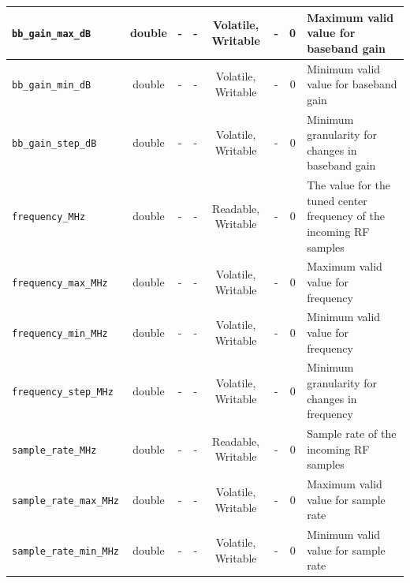 \documentclass{article}
\begin{document}
\begin{landscape}
\begin{scriptsize}
\begin{tabular}{|p{4cm}|c|c|c|c|c|c|p{8cm}|}
			\hline
			\verb+bb_gain_max_dB+               & double & -        & -          & Volatile, Writable & -           & 0       & Maximum valid value for baseband gain                                                      \\
			\hline
			\verb+bb_gain_min_dB+               & double & -        & -          & Volatile, Writable & -           & 0       & Minimum valid value for baseband gain                                                      \\
			\hline
			\verb+bb_gain_step_dB+              & double & -        & -          & Volatile, Writable & -           & 0       & Minimum granularity for changes in baseband gain                                           \\
			\hline
			\verb+frequency_MHz+                & double & -        & -          & Readable, Writable  & -           & 0       & The value for the tuned center frequency of the incoming RF samples                        \\
			\hline
			\verb+frequency_max_MHz+            & double & -        & -          & Volatile, Writable & -           & 0       & Maximum valid value for frequency                                                          \\
			\hline
			\verb+frequency_min_MHz+            & double & -        & -          & Volatile, Writable & -           & 0       & Minimum valid value for frequency                                                          \\
			\hline
			\verb+frequency_step_MHz+           & double & -        & -          & Volatile, Writable & -           & 0       & Minimum granularity for changes in frequency                                               \\
			\hline
			\verb+sample_rate_MHz+              & double & -        & -          & Readable, Writable  & -           & 0       & Sample rate of the incoming RF samples                                                     \\
			\hline
			\verb+sample_rate_max_MHz+          & double & -        & -          & Volatile, Writable & -           & 0       & Maximum valid value for sample rate                                                        \\
			\hline
			\verb+sample_rate_min_MHz+          & double & -        & -          & Volatile, Writable & -           & 0       & Minimum valid value for sample rate                                                        \\

\end{tabular}
\end{scriptsize}
\end{landscape}
\end{document}
